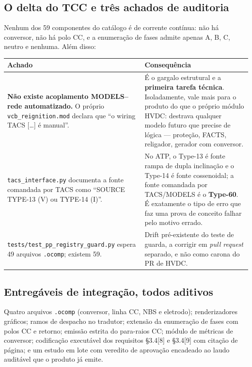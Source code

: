 \documentclass[12pt,a4paper]{article}
\newcommand{\arq}[1]{\texttt{\small #1}}
\begin{document}
\subsection{O delta do TCC e três achados de auditoria}

Nenhum dos 59 componentes do catálogo é de corrente contínua: não há conversor, não há polo CC, e a
enumeração de fases admite apenas A, B, C, neutro e nenhuma. Além disso:

\begin{center}
\small
\begin{tabularx}{\textwidth}{@{}p{5.4cm}X@{}}
\toprule
\textbf{Achado} & \textbf{Consequência} \\
\midrule
\textbf{Não existe acoplamento MODELS--rede automatizado.} O próprio
\arq{vcb\_reignition.mod} declara que \enquote{o wiring TACS [\ldots] é manual}. &
É o gargalo estrutural e a \textbf{primeira tarefa técnica}. Isoladamente, vale mais para o produto
do que o próprio módulo HVDC: destrava qualquer modelo futuro que precise de lógica --- proteção,
FACTS, religador, gerador com conversor. \\
\arq{tacs\_interface.py} documenta a fonte comandada por TACS como \enquote{SOURCE TYPE-13 (V) ou
TYPE-14 (I)}. &
No ATP, o Type-13 é fonte rampa de dupla inclinação e o Type-14 é fonte cossenoidal; a fonte
comandada por TACS/MODELS é o \textbf{Type-60}. É exatamente o tipo de erro que faz uma prova de
conceito falhar pelo motivo errado. \\
\arq{tests/test\_pp\_registry\_guard.py} espera 49 arquivos \arq{.ocomp}; existem 59. &
Drift pré-existente do teste de guarda, a corrigir em \emph{pull request} separado, e não como
carona do PR de HVDC. \\
\bottomrule
\end{tabularx}
\end{center}

\subsection{Entregáveis de integração, todos aditivos}

Quatro arquivos \arq{.ocomp} (conversor, linha CC, NBS e eletrodo); renderizadores gráficos; ramos de
despacho no tradutor; extensão da enumeração de fases com polos CC e retorno; emissão estrita do
para-raios CC; módulo de métricas de conversor; codificação executável dos requisitos \S3.4[8] e
\S3.4[9] com citação de página; e um estudo em lote com veredito de aprovação encadeado ao laudo
auditável que o produto já emite.
\end{document}
